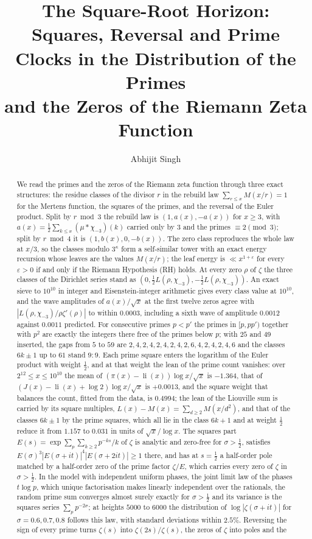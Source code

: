 \documentclass[11pt]{article}
\title{\textbf{The Square-Root Horizon:}\\[4pt]
\large Squares, Reversal and Prime Clocks in the Distribution of the Primes\\ and the Zeros of the Riemann Zeta Function}
\author{Abhijit Singh}
\date{}
\theoremstyle{definition}\newtheorem{definition}[theorem]{Definition}
\theoremstyle{remark}\newtheorem{remark}[theorem]{Remark}
\theoremstyle{definition}\newtheorem{axiom}{Axiom}
\newcommand{\li}{\operatorname{li}}\newcommand{\Tr}{\operatorname{Tr}}
\begin{document}
\maketitle
\begin{abstract}
We read the primes and the zeros of the Riemann zeta function through three exact structures: the residue classes of the divisor $r$ in the rebuild law $\sum_{r\le x}M(x/r)=1$ for the Mertens function, the squares of the primes, and the reversal of the Euler product. Split by $r\bmod3$ the rebuild law is $(1,a(x),-a(x))$ for $x\ge3$, with $a(x)=\frac12\sum_{k\le x}(\mu*\chi_{-3})(k)$ carried only by $3$ and the primes $\equiv2\pmod3$; split by $r\bmod4$ it is $(1,b(x),0,-b(x))$. The zero class reproduces the whole law at $x/3$, so the classes modulo $3^\kappa$ form a self-similar tower with an exact energy recursion whose leaves are the values $M(x/r)$; the leaf energy is $\ll x^{1+\varepsilon}$ for every $\varepsilon>0$ if and only if the Riemann Hypothesis (RH) holds. At every zero $\rho$ of $\zeta$ the three classes of the Dirichlet series stand as $(0,\frac12L(\rho,\chi_{-3}),-\frac12L(\rho,\chi_{-3}))$. An exact sieve to $10^{10}$ in integer and Eisenstein-integer arithmetic gives every class value at $10^{10}$, and the wave amplitudes of $a(x)/\sqrt x$ at the first twelve zeros agree with $|L(\rho,\chi_{-3})/\rho\zeta'(\rho)|$ to within $0.0003$, including a sixth wave of amplitude $0.0012$ against $0.0011$ predicted. For consecutive primes $p<p'$ the primes in $[p,pp')$ together with $p^2$ are exactly the integers there free of the primes below $p$; with $25$ and $49$ inserted, the gaps from $5$ to $59$ are $2,4,2,4,2,4,2,4,2,6,4,2,4,2,4,6$ and the classes $6k\pm1$ up to $61$ stand $9:9$. Each prime square enters the logarithm of the Euler product with weight $\frac12$, and at that weight the lean of the prime count vanishes: over $2^{12}\le x\le10^{10}$ the mean of $(\pi(x)-\li(x))\log x/\sqrt x$ is $-1.364$, that of $(J(x)-\li(x)+\log2)\log x/\sqrt x$ is $+0.0013$, and the square weight that balances the count, fitted from the data, is $0.4994$; the lean of the Liouville sum is carried by its square multiples, $L(x)-M(x)=\sum_{d\ge2}M(x/d^2)$, and that of the classes $6k\pm1$ by the prime squares, which all lie in the class $6k+1$ and at weight $\frac12$ reduce it from $1.157$ to $0.031$ in units of $\sqrt x/\log x$. The squares part $E(s)=\exp\sum_p\sum_{k\ge2}p^{-ks}/k$ of $\zeta$ is analytic and zero-free for $\sigma>\frac12$, satisfies $E(\sigma)^3|E(\sigma+it)|^4|E(\sigma+2it)|\ge1$ there, and has at $s=\frac12$ a half-order pole matched by a half-order zero of the prime factor $\zeta/E$, which carries every zero of $\zeta$ in $\sigma>\frac12$. In the model with independent uniform phases, the joint limit law of the phases $t\log p$, which unique factorisation makes linearly independent over the rationals, the random prime sum converges almost surely exactly for $\sigma>\frac12$ and its variance is the squares series $\sum_pp^{-2\sigma}$; at heights $5000$ to $6000$ the distribution of $\log|\zeta(\sigma+it)|$ for $\sigma=0.6,0.7,0.8$ follows this law, with standard deviations within $2.5\%$. Reversing the sign of every prime turns $\zeta(s)$ into $\zeta(2s)/\zeta(s)$, the zeros of $\zeta$ into poles and the 
\end{abstract}
\end{document}
